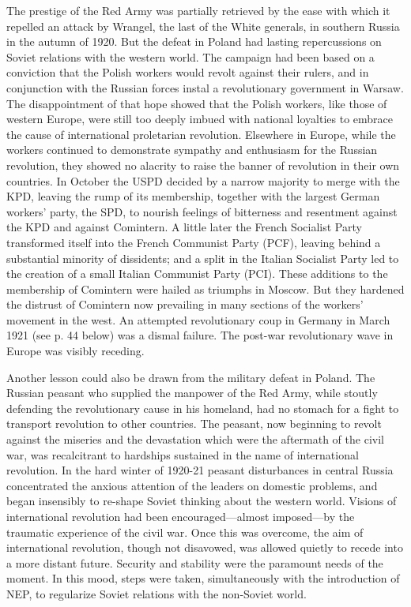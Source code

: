 The prestige of the Red Army was partially retrieved by the ease with which it repelled an attack by Wrangel, the last of the White generals, in southern Russia in the autumn of 1920. But the defeat in Poland had lasting repercussions on Soviet relations with the western world. The campaign had been based on a conviction that the Polish workers would revolt against their rulers, and in conjunction with the Russian forces instal a revolutionary government in Warsaw. The disappointment of that hope showed that the Polish workers, like those of western Europe, were still too deeply imbued with national loyalties to embrace the cause of international proletarian revolution. Elsewhere in Europe, while the workers continued to demonstrate sympathy and enthusiasm for the Russian revolution, they showed no alacrity to raise the banner of revolution in their own countries. In October the USPD decided by a narrow majority to merge with the KPD, leaving the rump of its membership, together with the largest German workers' party, the SPD, to nourish feelings of bitterness and resentment against the KPD and against Comintern. A little later the French Socialist Party transformed itself into the French Communist Party (PCF), leaving behind a substantial minority of dissidents; and a split in the Italian Socialist Party led to the creation of a small Italian Communist Party (PCI). These additions to the membership of Comintern were hailed as triumphs in Moscow. But they hardened the distrust of Comintern now prevailing in many sections of the workers' movement in the west. An attempted revolutionary coup in Germany in March 1921 (see p. 44 below) was a dismal failure. The post-war revolutionary wave in Europe was visibly receding. 

Another lesson could also be drawn from the military defeat in Poland. The Russian peasant who supplied the manpower of the Red Army, while stoutly defending the revolutionary cause in his homeland, had no stomach for a fight to transport revolution to other countries. The peasant, now beginning to revolt against the miseries and the devastation which were the aftermath of the civil war, was recalcitrant to hardships sustained in the name of international revolution. In the hard winter of 1920-21 peasant disturbances in central Russia concentrated the anxious attention of the leaders on domestic problems, and began insensibly to re-shape Soviet thinking about the western world. Visions of international revolution had been encouraged---almost imposed---by the traumatic experience of the civil war. Once this was overcome, the aim of international revolution, though not disavowed, was allowed quietly to recede into a more distant future. Security and stability were the paramount needs of the moment. In this mood, steps were taken, simultaneously with the introduction of NEP, to regularize Soviet relations with the non-Soviet world. 
